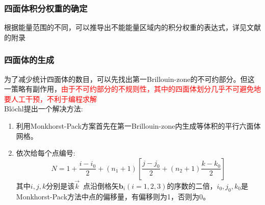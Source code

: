 \frame
{
	\frametitle{四面体积分权重的确定}
\begin{figure}[h!]
\centering
{}
	\hfill
{}
\end{figure}
根据能量范围的不同，可以推导出不能能量区域内的积分权重的表达式，详见文献\cite{PRB49-16233_1994}的附录
}

\frame
{
	\frametitle{四面体的生成}
	为了减少统计四面体的数目，可以先找出第一\textrm{Brillouin-zone}的不可约部分。但这一策略有副作用，\textcolor{red}{由于不可约部分的不规则性，其中的四面体划分几乎不可避免地要人工干预，不利于编程求解}\\\textrm{Bl\"ochl}提出一个解决方法:\\
\begin{enumerate}
	\item 利用\textrm{Monkhorst-Pack}方案首先在第一\textrm{Brillouin-zone}内生成等体积的平行六面体网格。
	\item 依次给每个点编号:
\begin{displaymath}
	\boxed{N=1+\dfrac{i-i_0}2+(n_1+1)\left[\dfrac{j-j_0}2+(n_2+1)\dfrac{k-k_0}2\right]}
\end{displaymath}
其中$i,j,k$分别是该$\vec k$~点沿倒格矢$\mathbf{b}_i(i=1,2,3)$的序数的二倍，$i_0,j_0,k_0$是\textrm{Monkhorst-Pack}方法中点的偏移量，有偏移则为1，否则为0。
\end{enumerate}
}

